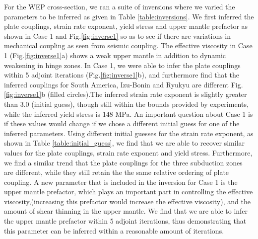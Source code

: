 \documentclass[12pt]{article}
\begin{document}
For the WEP cross-section, we ran a suite of inversions where we varied the parameters to be inferred as given in Table \ref{table:inversions}.  We first inferred the plate couplings, strain rate exponent, yield stress and upper mantle prefactor as shown in Case 1 and Fig.\ref{fig:inverse1} so as to see if there are variations in mechanical coupling as seen from seismic coupling. The effective viscosity in Case 1 (Fig.\ref{fig:inverse1}a) shows a weak upper mantle in addition to dynamic weakening in hinge zones.  In Case 1, we were able to infer the plate couplings within 5 adjoint iterations (Fig.\ref{fig:inverse1}b), and furthermore find that the inferred couplings for South America, Izu-Bonin and Ryukyu are different Fig.\ref{fig:inverse1}b (filled circles).The inferred strain rate exponent is slightly greater than 3.0 (initial guess), though still within the bounds provided by experiments, while the inferred yield stress is 148 MPa. An important question about Case 1 is if these values would change if we chose a different initial guess for one of the inferred parameters. Using different initial guesses for the strain rate exponent, as shown in Table \ref{table:initial_guess}, we find that we are able to recover similar values for the plate couplings, strain rate exponent and yield stress. Furthermore, we find a similar trend that the plate couplings for the three subduction zones are different, while they still retain the the same relative ordering of plate coupling.   
A new parameter that is included in the inversion for Case 1 is the upper mantle prefactor, which plays an important part in controlling the effective viscosity,(increasing this prefactor would increase the effective viscosity), and the amount of shear thinning in the upper mantle. We find that we are able to infer the upper mantle prefactor within 5 adjoint iterations, thus demonstrating that this parameter can be inferred within a reasonable amount of iterations.
\end{document}
